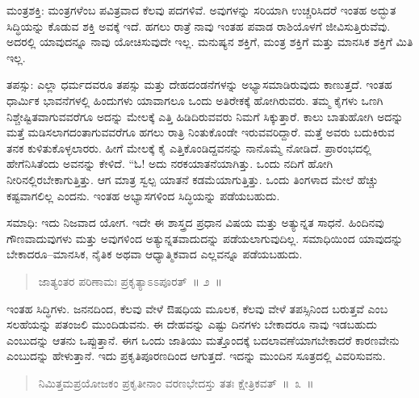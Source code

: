\vspace{0.2cm}

ಮಂತ್ರಶಕ್ತಿ: ಮಂತ್ರಗಳೆಂಬ ಪವಿತ್ರವಾದ ಕೆಲವು ಪದಗಳಿವೆ. ಅವುಗಳನ್ನು ಸರಿಯಾಗಿ ಉಚ್ಚರಿಸಿದರೆ ಇಂತಹ ಅದ್ಭುತ ಸಿದ್ಧಿಯನ್ನು ಕೊಡುವ ಶಕ್ತಿ ಅವಕ್ಕೆ ಇದೆ. ಹಗಲು ರಾತ್ರೆ ನಾವು ಇಂತಹ ಪವಾಡ ರಾಶಿಯೊಳಗೆ ಜೀವಿಸುತ್ತಿರುವೆವು. ಅದರಲ್ಲಿ ಯಾವುದನ್ನೂ ನಾವು ಯೋಚಿಸುವುದೇ ಇಲ್ಲ. ಮನುಷ್ಯನ ಶಕ್ತಿಗೆ, ಮಂತ್ರ ಶಕ್ತಿಗೆ ಮತ್ತು ಮಾನಸಿಕ ಶಕ್ತಿಗೆ ಮಿತಿ ಇಲ್ಲ. 

\vspace{0.2cm}

ತಪಸ್ಸು: ಎಲ್ಲಾ ಧರ್ಮದವರೂ ತಪಸ್ಸು ಮತ್ತು ದೇಹದಂಡನೆಗಳನ್ನು ಅಭ್ಯಾಸಮಾಡಿರುವುದು ಕಾಣುತ್ತದೆ. ಇಂತಹ ಧಾರ್ಮಿಕ ಭಾವನೆಗಳಲ್ಲಿ ಹಿಂದುಗಳು ಯಾವಾಗಲೂ ಒಂದು ಅತಿರೇಕಕ್ಕೆ ಹೋಗಿರುವರು. ತಮ್ಮ ಕೈಗಳು ಒಣಗಿ ನಿಶ್ಚೇಷ್ಟಿತವಾಗುವವರೆಗೂ ಅದನ್ನು ಮೇಲಕ್ಕೆ ಎತ್ತಿ ಹಿಡಿದಿರುವವರು ನಿಮಗೆ ಸಿಕ್ಕುತ್ತಾರೆ. ಕಾಲು ಬಾತುಹೋಗಿ ಅದನ್ನು ಮತ್ತೆ ಮಡಿಸಲಾಗದಂತಾಗುವವರೆಗೂ ಹಗಲು ರಾತ್ರಿ ನಿಂತುಕೊಂಡೇ ಇರುವವರಿದ್ದಾರೆ. ಮತ್ತೆ ಅವರು ಬದುಕಿರುವ ತನಕ ಕುಳಿತುಕೊಳ್ಳಲಾರರು. ಹೀಗೆ ಮೇಲಕ್ಕೆ ಕೈ ಎತ್ತಿಕೊಂಡಿದ್ದವನನ್ನು ನಾನೊಮ್ಮೆ ನೋಡಿದೆ. ಪ್ರಾರಂಭದಲ್ಲಿ ಹೇಗೆನಿಸಿತೆಂದು ಅವನನ್ನು ಕೇಳಿದೆ. “ಓ! ಅದು ನರಕಯಾತನೆಯಾಗಿತ್ತು. ಒಂದು ನದಿಗೆ ಹೋಗಿ ನೀರಿನಲ್ಲಿರಬೇಕಾಗುತ್ತಿತ್ತು. ಆಗ ಮಾತ್ರ ಸ್ವಲ್ಪ ಯಾತನೆ ಕಡಮೆಯಾಗುತ್ತಿತ್ತು. ಒಂದು ತಿಂಗಳಾದ ಮೇಲೆ ಹೆಚ್ಚು ಕಷ್ಟವಾಗಲಿಲ್ಲ ಎಂದನು. ಇಂತಹ ಅಭ್ಯಾಸಗಳಿಂದ ಸಿದ್ಧಿಯನ್ನು ಪಡೆಯಬಹುದು. 

\vspace{0.2cm}

ಸಮಾಧಿ: ಇದು ನಿಜವಾದ ಯೋಗ. ಇದೇ ಈ ಶಾಸ್ತ್ರದ ಪ್ರಧಾನ ವಿಷಯ ಮತ್ತು ಅತ್ಯುನ್ನತ ಸಾಧನೆ. ಹಿಂದಿನವು ಗೌಣವಾದುವುಗಳು ಮತ್ತು ಅವುಗಳಿಂದ ಅತ್ಯುನ್ನತವಾದುದನ್ನು ಪಡೆಯಲಾಗುವುದಿಲ್ಲ. ಸಮಾಧಿಯಿಂದ ಯಾವುದನ್ನು ಬೇಕಾದರೂ–ಮಾನಸಿಕ, ನೈತಿಕ ಅಥವಾ ಆಧ್ಯಾತ್ಮಿಕವಾದ ಎಲ್ಲವನ್ನೂ ಪಡೆಯಬಹುದು. 

\newpage

\begin{verse}
ಜಾತ್ಯಂತರ ಪರಿಣಾಮಃ ಪ್ರಕೃತ್ಯಾಽಽಪೂರತ್​~॥ ೨~॥
\end{verse}

\vspace{-0.4cm}


\vspace{0.2cm}

ಇಂತಹ ಸಿದ್ಧಿಗಳು. ಜನನದಿಂದ, ಕೆಲವು ವೇಳೆ ಔಷಧಿಯ ಮೂಲಕ, ಕೆಲವು ವೇಳೆ ತಪಸ್ಸಿನಿಂದ ಬರುತ್ತವೆ ಎಂಬ ಸಲಹೆಯನ್ನು ಪತಂಜಲಿ ಮುಂದಿಡುವನು. ಈ ದೇಹವನ್ನು ಎಷ್ಟು ದಿನಗಳು ಬೇಕಾದರೂ ನಾವು ಇಡಬಹುದು ಎಂಬುದನ್ನು ಆತನು ಒಪ್ಪುತ್ತಾನೆ. ಈಗ ಒಂದು ಜಾತಿಯು ಮತ್ತೊಂದಕ್ಕೆ ಬದಲಾವಣೆಯಾಗಬೇಕಾದರೆ ಕಾರಣವೇನು ಎಂಬುದನ್ನು ಹೇಳುತ್ತಾನೆ. ಇದು ಪ್ರಕೃತಿಪೂರಣದಿಂದ ಆಗುತ್ತದೆ. ಇದನ್ನು ಮುಂದಿನ ಸೂತ್ರದಲ್ಲಿ ವಿವರಿಸುವನು. 

\vspace{-0.1cm}

\begin{verse}
ನಿಮಿತ್ತಮಪ್ರಯೋಜಕಂ ಪ್ರಕೃತೀನಾಂ ವರಣಭೇದಸ್ತು ತತಃ ಕ್ಷೇತ್ರಿಕವತ್​~॥~೩~॥
\end{verse}

